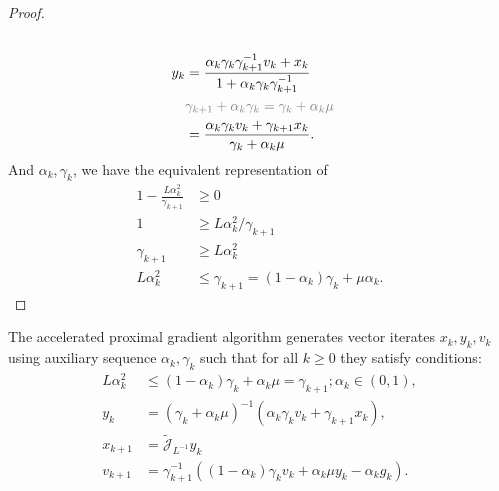 \documentclass[12pt]{article}
\begin{document}
\begin{proof}
\begin{align*}
            \\
            y_k &= 
            \frac{
                \alpha_k \gamma_k \gamma_{k + 1}^{-1}v_k + x_k
            }{1 + \alpha_k \gamma_k \gamma_{k + 1}^{-1}}
            \\
            & 
            \textcolor{gray}{
                \gamma_{k + 1} + \alpha_k \gamma_k 
                = 
                \gamma_k + \alpha_k \mu
            }
            \\
            &=  
            \frac{\alpha_k \gamma_k v_k + \gamma_{k + 1}x_k}{\gamma_k + \alpha_k \mu}. 
        \end{align*}
        And $\alpha_k, \gamma_k$, we have the equivalent representation of 
        \begin{align*}
            1 - \frac{L \alpha_k^2}{\gamma_{k + 1}}
            &\ge 0
            \\
            1 &\ge L \alpha_k^2 / \gamma_{k + 1}
            \\
            \gamma_{k + 1} &\ge L \alpha_k^2
            \\
            L\alpha_k^2 
            &\le
            \gamma_{k + 1} = (1 - \alpha_k)\gamma_k + \mu \alpha_k. 
        \end{align*}
    \end{proof}
    
    \begin{definition}
    \label{app:def:acc-prox-grad-raw-form}
        The accelerated proximal gradient algorithm generates vector iterates $x_k, y_k, v_k$ using auxiliary sequence $\alpha_k, \gamma_k$ such that for all $k\ge0$ they satisfy conditions: 
        \begin{align*}
            L\alpha_k^2 
            &\le 
            (1 - \alpha_k)\gamma_k + \alpha_k\mu = \gamma_{k + 1}; \alpha_k \in (0, 1), 
            \\
            y_k &= (\gamma_k + \alpha_k \mu)^{-1}
            (\alpha_k \gamma_k v_k + \gamma_{k + 1}x_k),
            \\
            x_{k + 1}&= 
            \widetilde{\mathcal J}_{L^{-1}} y_k
            \\
            v_{k + 1} &= 
            \gamma_{k + 1}^{-1}
            \left(
                (1 - \alpha_k)\gamma_k v_k + \alpha_k \mu y_k - \alpha_k g_k
            \right). 
        \end{align*}
    \end{definition}
\end{document}
